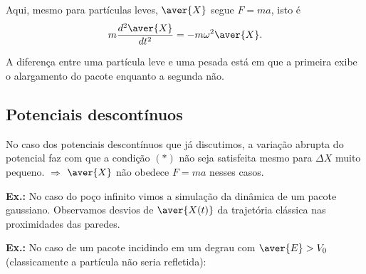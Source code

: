 Aqui, mesmo para partículas leves, $\aver{X}$ segue $F = ma$, isto é
\begin{equation}
    m\frac{d^2\aver{X}}{dt^2} = -m\omega^2 \aver{X}.
\label{eq:aula15_newton_harmonico}
\end{equation}

A diferença entre uma partícula leve e uma pesada está em que a primeira exibe o alargamento do pacote enquanto a segunda não.

\subsection*{Potenciais descontínuos}

No caso dos potenciais descontínuos que já discutimos, a variação abrupta do potencial faz com que a condição $(*)$ não seja satisfeita mesmo para $\Delta X$ muito pequeno. $\Rightarrow$ $\aver{X}$ não obedece $F = ma$ nesses casos.

\textbf{Ex.:} No caso do poço infinito vimos a simulação da dinâmica de um pacote gaussiano. Observamos desvios de $\aver{X(t)}$ da trajetória clássica nas proximidades das paredes.

\begin{center}
\end{center}

\textbf{Ex.:} No caso de um pacote incidindo em um degrau com $\aver{E} > V_0$ (classicamente a partícula não seria refletida):

